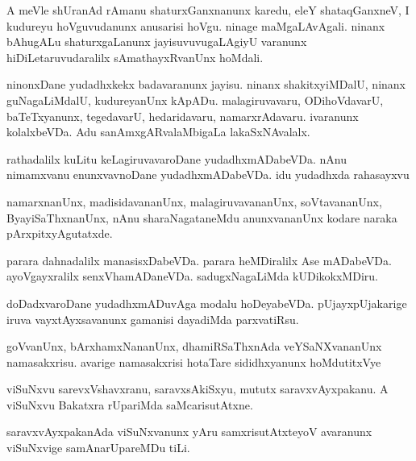 \documentclass{article}
\begin{document}
\begin{mn}%
A meVle shUranAd rAmanu shaturxGanxnanunx karedu, eleY shataqGanxneV, I kudureyu 
hoVguvudanunx anusarisi hoVgu. ninage maMgaLAvAgali. ninanx bAhugALu shaturxgaLanunx 
jayisuvuvugaLAgiyU varanunx hiDiLetaruvudaralilx sAmathayxRvanUnx hoMdali.
\end{mn}

\begin{mn}%
ninonxDane yudadhxkekx badavaranunx jayisu. ninanx shakitxyiMDalU, ninanx guNagaLiMdalU,
kudureyanUnx kApADu. malagiruvavaru, ODihoVdavarU, baTeTxyanunx, tegedavarU, hedaridavaru, 
namarxrAdavaru. ivaranunx kolalxbeVDa. Adu sanAmxgARvalaMbigaLa lakaSxNAvalalx.
\end{mn}

\begin{mn}%
rathadalilx kuLitu keLagiruvavaroDane yudadhxmADabeVDa. nAnu nimamxvanu enunxvavnoDane 
yudadhxmADabeVDa. idu yudadhxda rahasayxvu
\end{mn}

\begin{mn}%
namarxnanUnx, madisidavananUnx, malagiruvavananUnx, soVtavananUnx, ByayiSaThxnanUnx, nAnu 
sharaNagataneMdu anunxvananUnx kodare naraka pArxpitxyAgutatxde.
\end{mn}

\begin{mn}%
parara dahnadalilx manasisxDabeVDa. parara heMDiralilx Ase mADabeVDa. ayoVgayxralilx 
senxVhamADaneVDa. sadugxNagaLiMda kUDikokxMDiru.
\end{mn}

\begin{mn}%
doDadxvaroDane yudadhxmADuvAga modalu hoDeyabeVDa. pUjayxpUjakarige iruva vayxtAyxsavanunx 
gamanisi dayadiMda parxvatiRsu.
\end{mn}

\begin{mn}%
goVvanUnx, bArxhamxNananUnx, dhamiRSaThxnAda veYSaNXvananUnx namasakxrisu. avarige 
namasakxrisi hotaTare sididhxyanunx hoMdutitxVye
\end{mn}

\begin{mn}%
viSuNxvu sarevxVshavxranu, saravxsAkiSxyu, mututx saravxvAyxpakanu. A viSuNxvu Bakatxra 
rUpariMda saMcarisutAtxne.
\end{mn}

\begin{mn}%
saravxvAyxpakanAda viSuNxvanunx yAru samxrisutAtxteyoV avaranunx viSuNxvige 
samAnarUpareMDu tiLi.
\end{mn}
\end{document}
